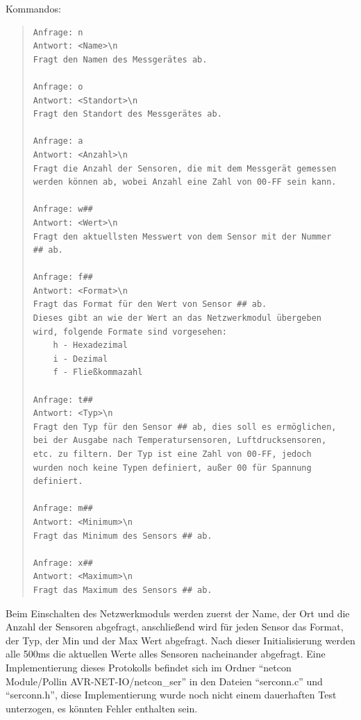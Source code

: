\documentclass[a4paper,14pt,headsepline]{scrartcl}
\begin{document}
Kommandos:
\begin{quote}
\begin{verbatim}
Anfrage: n
Antwort: <Name>\n
Fragt den Namen des Messgerätes ab.

Anfrage: o
Antwort: <Standort>\n
Fragt den Standort des Messgerätes ab.

Anfrage: a
Antwort: <Anzahl>\n
Fragt die Anzahl der Sensoren, die mit dem Messgerät gemessen
werden können ab, wobei Anzahl eine Zahl von 00-FF sein kann.

Anfrage: w##
Antwort: <Wert>\n
Fragt den aktuellsten Messwert von dem Sensor mit der Nummer
## ab.

Anfrage: f##
Antwort: <Format>\n
Fragt das Format für den Wert von Sensor ## ab.
Dieses gibt an wie der Wert an das Netzwerkmodul übergeben
wird, folgende Formate sind vorgesehen:
    h - Hexadezimal
    i - Dezimal
    f - Fließkommazahl
    
Anfrage: t##
Antwort: <Typ>\n
Fragt den Typ für den Sensor ## ab, dies soll es ermöglichen,
bei der Ausgabe nach Temperatursensoren, Luftdrucksensoren,
etc. zu filtern. Der Typ ist eine Zahl von 00-FF, jedoch
wurden noch keine Typen definiert, außer 00 für Spannung
definiert.

Anfrage: m##
Antwort: <Minimum>\n
Fragt das Minimum des Sensors ## ab.

Anfrage: x##
Antwort: <Maximum>\n
Fragt das Maximum des Sensors ## ab.
\end{verbatim}
\end{quote}

Beim Einschalten des Netzwerkmoduls werden zuerst der Name, der Ort und die Anzahl der Sensoren abgefragt, anschließend wird für jeden Sensor das Format, der Typ, der Min und der Max Wert abgefragt. Nach dieser Initialisierung werden alle 500ms die aktuellen Werte alles Sensoren nacheinander abgefragt. Eine Implementierung dieses Protokolls befindet sich im Ordner "`netcon Module/Pollin AVR-NET-IO/netcon\_ser"' in den Dateien "`serconn.c"' und "`serconn.h"', diese Implementierung wurde noch nicht einem dauerhaften Test unterzogen, es könnten Fehler enthalten sein.
\end{document}
